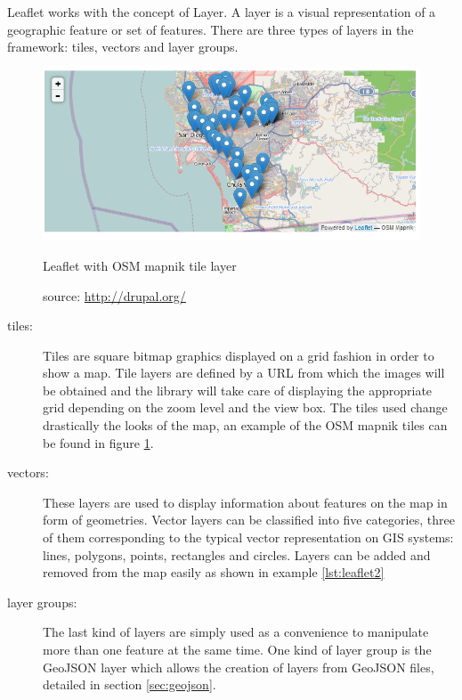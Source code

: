 Leaflet works with the concept of Layer. A layer is a visual representation of a geographic feature or set of features. There are three types of layers in the framework: tiles, vectors and layer groups.

\begin{figure}
  \centering
  \includegraphics[width=.8\textwidth]{fig/leaflet-osmmapnik}
  \caption{Leaflet with OSM mapnik tile layer}
  \caption*{source: \url{http://drupal.org/}}
  \label{fig:leaflet1}
\end{figure} 

\begin{description}
\item[tiles:] Tiles are square bitmap graphics displayed on a grid fashion in order to show a map. Tile layers are defined by a URL from which the images will be obtained and the library will take care of displaying the appropriate grid depending on the zoom level and the view box. The tiles used change drastically the looks of the map, an example of the OSM mapnik tiles can be found in figure \ref{fig:leaflet1}.

\item[vectors:] These layers are used to display information about features on the map in form of geometries. Vector layers can be classified into five categories, three of them corresponding to the typical vector representation on GIS systems: lines, polygons, points, rectangles and circles. Layers can be added and removed from the map easily as shown in example \ref{lst:leaflet2}

\item[layer groups:] The last kind of layers are simply used as a convenience to manipulate more than one feature at the same time. One kind of layer group is the GeoJSON layer which allows the creation of layers from GeoJSON files, detailed in section \ref{sec:geojson}.

\end{description}

